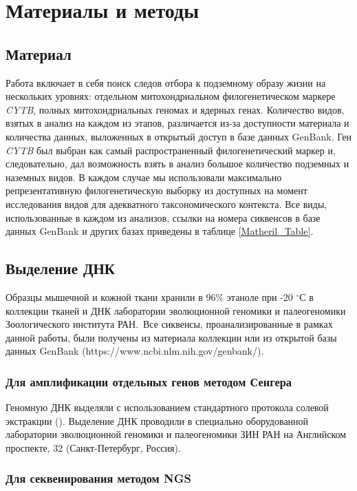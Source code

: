 \chapter{Материалы и методы} \label{mm}

\section{Материал}

Работа включает в себя поиск следов отбора к подземному образу жизни на нескольких уровнях: отдельном митохондриальном филогенетическом маркере \textit{CYTB}, полных митохондриальных геномах и ядерных генах. Количество видов, взятых в анализ на каждом из этапов, различается из-за доступности материала и количества данных, выложенных в открытый доступ в базе данных GenBank. Ген \textit{CYTB} был выбран как самый распространенный филогенетический маркер и, следовательно, дал возможность взять в анализ большое количество подземных и наземных видов.
В каждом случае мы использовали максимально репрезентативную филогенетическую выборку из доступных на момент исследования видов для адекватного таксономического контекста. Все виды, использованные в каждом из анализов, ссылки на номера сиквенсов в базе данных GenBank и других базах приведены в таблице \ref{Matheril_Table}. 

\section{Выделение ДНК}

Образцы мышечной и кожной ткани хранили в 96\% этаноле при -20 $^\circ$С в коллекции тканей и ДНК лаборатории эволюционной геномики и палеогеномики Зоологического института РАН. Все сиквенсы, проанализированные в рамках данной работы, были получены из материала коллекции или из открытой базы данных GenBank (https://www.ncbi.nlm.nih.gov/genbank/).

\subsection{Для амплификации отдельных генов методом Сенгера}

Геномную ДНК выделяли с использованием стандартного протокола солевой экстракции (\cite{Miller1999}). Выделение ДНК проводили в специально оборудованной лаборатории эволюционной геномики и палеогеномики ЗИН РАН на Английском проспекте, 32 (Санкт-Петербург, Россия).

\subsection{Для секвенирования методом NGS}

